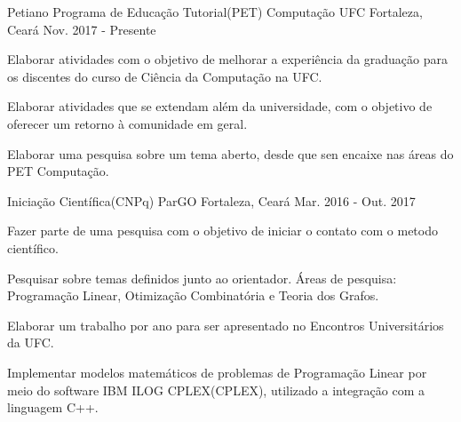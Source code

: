 

\begin{cventries}


  \cventry
    {Petiano} %
    {Programa de Educação Tutorial(PET) Computação UFC} %
    {Fortaleza, Ceará} %
    {Nov. 2017 - Presente} %
    {
      \begin{cvitems} %
        \item {Elaborar atividades com o objetivo de melhorar a experiência da graduação para os discentes do curso de Ciência da Computação na UFC.}
        \item {Elaborar atividades que se extendam além da universidade, com o objetivo de oferecer um retorno à comunidade em geral.}
        \item {Elaborar uma pesquisa sobre um tema aberto, desde que sen encaixe nas áreas do PET Computação.}
      \end{cvitems}
    }
\vskip 0.2cm
  \cventry
    {Iniciação Científica(CNPq)} %
    {ParGO} %
    {Fortaleza, Ceará} %
    {Mar. 2016 - Out. 2017} %
    {
      \begin{cvitems} %
        \item {Fazer parte de uma pesquisa com o objetivo de iniciar o contato com o metodo científico.}
        \item {Pesquisar sobre temas definidos junto ao orientador. Áreas de pesquisa: Programação Linear, Otimização Combinatória e Teoria dos Grafos.}
        \item {Elaborar um trabalho por ano para ser apresentado no Encontros Universitários da UFC.}
        \item {Implementar modelos matemáticos de problemas de Programação Linear por meio do software IBM ILOG CPLEX(CPLEX), utilizado a integração com a linguagem C++.}
      \end{cvitems}
    }
\vskip 0.2cm

\end{cventries}
